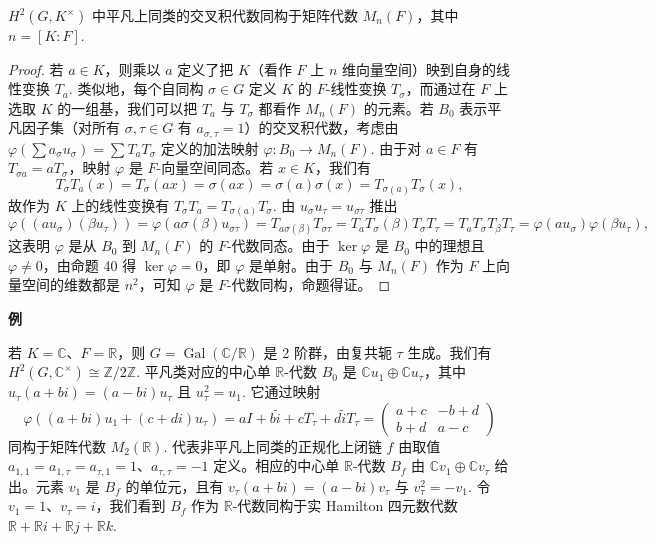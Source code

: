 \begin{proposition}\label{pro:17.41}
\(H^2(G, K^\times)\) 中平凡上同类的交叉积代数同构于矩阵代数 \(M_n(F)\)，其中 \(n = [K:F]\).
\end{proposition}

\begin{proof}
若 \(a \in K\)，则乘以 \(a\) 定义了把 \(K\)（看作 \(F\) 上 \(n\) 维向量空间）映到自身的线性变换 \(T_a\). 类似地，每个自同构 \(\sigma \in G\) 定义 \(K\) 的 \(F\)-线性变换 \(T_\sigma\)，而通过在 \(F\) 上选取 \(K\) 的一组基，我们可以把 \(T_a\) 与 \(T_\sigma\) 都看作 \(M_n(F)\) 的元素。若 \(B_0\) 表示平凡因子集（对所有 \(\sigma, \tau \in G\) 有 \(a_{\sigma,\tau} = 1\)）的交叉积代数，考虑由 \(\varphi(\sum a_\sigma u_\sigma) = \sum T_aT_\sigma\) 定义的加法映射 \(\varphi : B_0 \to M_n(F)\). 由于对 \(a \in F\) 有 \(T_{\sigma a} = aT_\sigma\)，映射 \(\varphi\) 是 \(F\)-向量空间同态。若 \(x \in K\)，我们有
\[
T_\sigma T_a(x) = T_\sigma(ax) = \sigma(ax) = \sigma(a)\sigma(x) = T_{\sigma(a)}T_\sigma(x),
\]
故作为 \(K\) 上的线性变换有 \(T_\sigma T_a = T_{\sigma(a)}T_\sigma\). 由 \(u_\sigma u_\tau = u_{\sigma\tau}\) 推出
\[
\varphi((au_\sigma)(\beta u_\tau)) = \varphi(a\sigma(\beta)u_{\sigma\tau}) = T_{a\sigma(\beta)}T_{\sigma\tau} = T_aT_\sigma(\beta)T_\sigma T_\tau = T_aT_\sigma T_\beta T_\tau = \varphi(au_\sigma)\varphi(\beta u_\tau),
\]
这表明 \(\varphi\) 是从 \(B_0\) 到 \(M_n(F)\) 的 \(F\)-代数同态。由于 \(\ker\varphi\) 是 \(B_0\) 中的理想且 \(\varphi \neq 0\)，由命题 40 得 \(\ker\varphi = 0\)，即 \(\varphi\) 是单射。由于 \(B_0\) 与 \(M_n(F)\) 作为 \(F\) 上向量空间的维数都是 \(n^2\)，可知 \(\varphi\) 是 \(F\)-代数同构，命题得证。
\end{proof}

\noindent\textbf{例}

若 \(K = \mathbb{C}\)、\(F = \mathbb{R}\)，则 \(G = \operatorname{Gal}(\mathbb{C}/\mathbb{R})\) 是 2 阶群，由复共轭 \(\tau\) 生成。我们有 \(H^2(G, \mathbb{C}^\times) \cong \mathbb{Z}/2\mathbb{Z}\). 平凡类对应的中心单 \(\mathbb{R}\)-代数 \(B_0\) 是 \(\mathbb{C}u_1 \oplus \mathbb{C}u_\tau\)，其中 \(u_\tau(a+bi) = (a-bi)u_\tau\) 且 \(u_\tau^2 = u_1\). 它通过映射
\[
\varphi((a+bi)u_1+(c+di)u_\tau) = aI+b\tilde i+cT_\tau+d\tilde iT_\tau = \begin{pmatrix}a+c & -b+d\\ b+d & a-c\end{pmatrix}
\]
同构于矩阵代数 \(M_2(\mathbb{R})\). 代表非平凡上同类的正规化上闭链 \(f\) 由取值 \(a_{1,1} = a_{1,\tau} = a_{\tau,1} = 1\)、\(a_{\tau,\tau} = -1\) 定义。相应的中心单 \(\mathbb{R}\)-代数 \(B_f\) 由 \(\mathbb{C}v_1 \oplus \mathbb{C}v_\tau\) 给出。元素 \(v_1\) 是 \(B_f\) 的单位元，且有 \(v_\tau(a+bi) = (a-bi)v_\tau\) 与 \(v_\tau^2 = -v_1\). 令 \(v_1 = 1\)、\(v_\tau = i\)，我们看到 \(B_f\) 作为 \(\mathbb{R}\)-代数同构于实 Hamilton 四元数代数 \(\mathbb{R}+\mathbb{R}i+\mathbb{R}j+\mathbb{R}k\).

